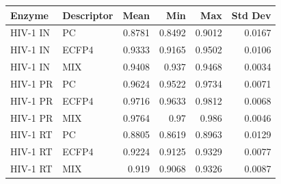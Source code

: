 \begin{tabular}{llrrrr}
\toprule
Enzyme & Descriptor & Mean & Min & Max & Std Dev \\
\midrule
HIV-1 IN & PC & 0.8781 & 0.8492 & 0.9012 & 0.0167 \\
HIV-1 IN & ECFP4 & 0.9333 & 0.9165 & 0.9502 & 0.0106 \\
HIV-1 IN & MIX & 0.9408 & 0.937 & 0.9468 & 0.0034 \\
HIV-1 PR & PC & 0.9624 & 0.9522 & 0.9734 & 0.0071 \\
HIV-1 PR & ECFP4 & 0.9716 & 0.9633 & 0.9812 & 0.0068 \\
HIV-1 PR & MIX & 0.9764 & 0.97 & 0.986 & 0.0046 \\
HIV-1 RT & PC & 0.8805 & 0.8619 & 0.8963 & 0.0129 \\
HIV-1 RT & ECFP4 & 0.9224 & 0.9125 & 0.9329 & 0.0077 \\
HIV-1 RT & MIX & 0.919 & 0.9068 & 0.9326 & 0.0087 \\
\bottomrule
\end{tabular}

